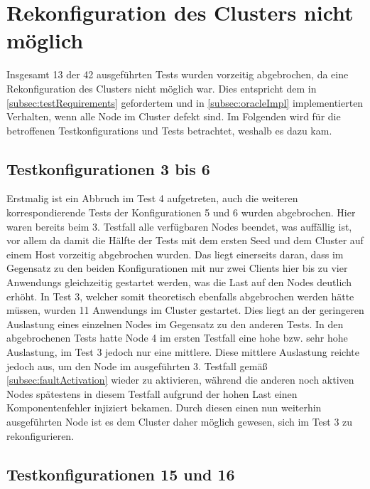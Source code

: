 \section{Rekonfiguration des Clusters nicht möglich}
\label{sec:noReconfig}

Insgesamt 13 der 42 ausgeführten \glspl{Test} wurden vorzeitig abgebrochen, da eine Rekonfiguration des Clusters nicht möglich war.
Dies entspricht dem in \cref{subsec:testRequirements} gefordertem und in \cref{subsec:oracleImpl} implementierten Verhalten, wenn alle Node im Cluster defekt sind.
Im Folgenden wird für die betroffenen \glspl{Testkonfiguration} und \glspl{Test} betrachtet, weshalb es dazu kam.

\subsection{Testkonfigurationen 3 bis 6}
\label{subsec:noReconf36}

Erstmalig ist ein Abbruch im \gls{Test} 4 aufgetreten, auch die weiteren korrespondierende \glspl{Test} der Konfigurationen 5 und 6 wurden abgebrochen.
Hier waren bereits beim 3. \gls{Testfall} alle verfügbaren Nodes beendet, was auffällig ist, vor allem da damit die Hälfte der \glspl{Test} mit dem ersten Seed und dem Cluster auf einem Host vorzeitig abgebrochen wurden.
Das liegt einerseits daran, dass im Gegensatz zu den beiden Konfigurationen mit nur zwei Clients hier bis zu vier \glspl{Anwendung} gleichzeitig gestartet werden, was die Last auf den Nodes deutlich erhöht.
In \gls{Test} 3, welcher somit theoretisch ebenfalls abgebrochen werden hätte müssen, wurden 11 \glspl{Anwendung} im Cluster gestartet.
Dies liegt an der geringeren Auslastung eines einzelnen Nodes im Gegensatz zu den anderen Tests.
In den abgebrochenen \glspl{Test} hatte Node 4 im ersten \gls{Testfall} eine hohe bzw. sehr hohe Auslastung, im \gls{Test} 3 jedoch nur eine mittlere.
Diese mittlere Auslastung reichte jedoch aus, um den Node im ausgeführten 3. \gls{Testfall} gemäß \cref{subsec:faultActivation} wieder zu aktivieren, während die anderen noch aktiven Nodes spätestens in diesem \gls{Testfall} aufgrund der hohen Last einen Komponentenfehler injiziert bekamen.
Durch diesen einen nun weiterhin ausgeführten Node ist es dem Cluster daher möglich gewesen, sich im \gls{Test} 3 zu rekonfigurieren.

\subsection{Testkonfigurationen 15 und 16}
\label{subsec:noReconf1516}

